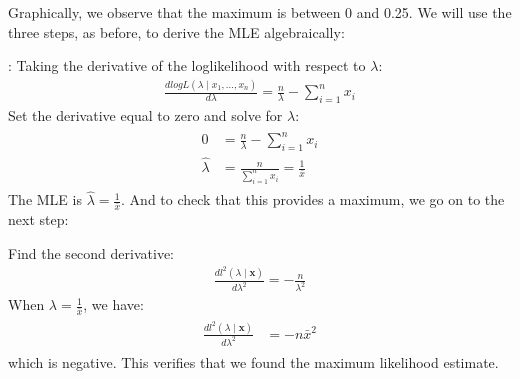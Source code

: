\documentclass[letterpaper,10pt,english]{jupyterBook}
\begin{document}
\noindent{}

\sphinxAtStartPar
Graphically, we observe that the maximum is between 0 and 0.25. We will use the three steps, as before, to derive the MLE algebraically:

\sphinxAtStartPar
{}: Taking the derivative of the log\sphinxhyphen{}likelihood with respect to \(\lambda\):
\begin{equation*}
\begin{split}
\begin{equation}
\frac{d log L\left( \lambda \mid x_1 ,..., x_n \right) }{d \lambda} = \frac{n}{\lambda}- \sum_{i=1}^n x_i 
\end{equation}
\end{split}
\end{equation*}
\sphinxAtStartPar
{} Set the derivative equal to zero and solve for \(\lambda\):
\begin{equation*}
\begin{split}
\begin{align*}
0 &= \frac{n}{\lambda}- \sum_{i=1}^n x_i \\
\hat{\lambda} &= \frac{n }{\sum_{i=1}^n x_i} = \frac{1}{\bar{x}}
\end{align*}
\end{split}
\end{equation*}
\sphinxAtStartPar
The MLE is \(\hat{\lambda}= \frac{1}{\bar{x}}\). And to check that this provides a maximum, we go on to the next step:

\sphinxAtStartPar
{} Find the second derivative:
\begin{equation*}
\begin{split}
\begin{equation}
\frac{d l^2 \left( \lambda \mid \boldsymbol{x} \right)}{d \lambda ^2} 
= - \frac{n}{\lambda^2}
\end{equation}
\end{split}
\end{equation*}
\sphinxAtStartPar
When \({\lambda}=\frac{1}{\bar{x}}\), we have:
\begin{equation*}
\begin{split}
\begin{align}
 \frac{d l^2 \left( \lambda \mid \boldsymbol{x} \right)}{d \lambda ^2}  
 &=-n \bar{x}^2
 \end{align}
\end{split}
\end{equation*}
\sphinxAtStartPar
which is negative. This verifies that we found the maximum likelihood estimate.
\end{document}
